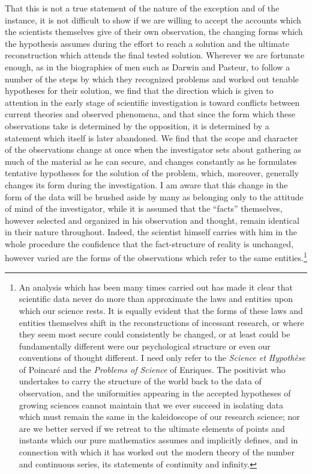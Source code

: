 \documentclass[12pt]{article}
\begin{document}
That this is not a true statement of the nature of
the exception and of the instance, it is not difficult to
show if we are willing to accept the accounts which
the scientists themselves give of their own observation,
the changing forms which the hypothesis assumes during
the effort to reach a solution and the ultimate
reconstruction which attends the final tested solution.
Wherever we are fortunate enough, as in the biographies
of men such as Darwin and Pasteur, to follow
a number of the steps by which they recognized problems
and worked out tenable hypotheses for their
solution, we find that the direction which is given to
attention in the early stage of scientific investigation
is toward conflicts between current theories and observed
phenomena, and that since the form which these
observations take is determined by the opposition, it is
determined by a statement which itself is later abandoned.
We find that the scope and character of the
observations change at once when the investigator sets
about gathering as much of the material as he can
secure, and changes constantly as he formulates tentative
hypotheses for the solution of the problem, which,
moreover, generally changes its form during the investigation.
I am aware that this change in the form
of the data will be brushed aside by many as belonging
only to the attitude of mind of the investigator, while
it is assumed that the ``facts'' themselves, however
selected and organized in his observation and thought,
remain identical in their nature throughout. Indeed,
the scientist himself carries with him in the whole procedure
the confidence that the fact-structure of reality
is unchanged, however varied are the forms of the observations
which refer to the same entities.\footnote{An analysis which has been many times carried out has made it clear that scientific data never do more than approximate the laws and entities upon which our science rests. It is equally evident that the forms of these laws and entities themselves shift in the reconstructions of incessant research, or where they seem most secure could consistently be changed, or at least could be fundamentally different were our psychological structure or even our conventions of thought different. I need only refer to the \emph{Science et Hypoth\`{e}se} of Poincar\'{e} and the \emph{Problems of Science} of Enriques. The positivist who undertakes to carry the structure of the world back to the data of observation, and the uniformities appearing in the accepted hypotheses of growing sciences cannot maintain that we ever succeed in isolating data which must remain the same in the kaleidoscope of our research science; nor are we better served if we retreat to the ultimate elements of points and instants which our pure mathematics assumes and implicitly defines, and in connection with which it has worked out the modern theory of the number and continuous series, its statements of continuity and infinity.}
\end{document}
